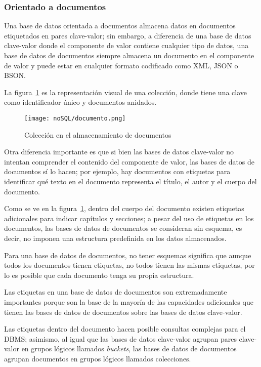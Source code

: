 \subsubsection{Orientado a documentos}
Una base de datos orientada a documentos almacena datos en documentos etiquetados en pares clave-valor; sin embargo, a diferencia de una base de datos clave-valor donde el componente de valor contiene cualquier tipo de datos, una base de datos de documentos siempre almacena un documento en el componente de valor y puede estar en cualquier formato codificado como XML, JSON o BSON.


La figura~\ref{img:documentos-documento} es la representación visual de una colección, donde tiene una clave como identificador único y documentos anidados.

\begin{figure}[H]
    \centering
    \texttt{[image: noSQL/documento.png]}
    \caption{Colección en el almacenamiento de documentos}
    \label{img:documentos-documento}
\end{figure}
Otra diferencia importante es que si bien las bases de datos clave-valor no intentan comprender el contenido del componente de valor, las bases de datos de documentos sí lo hacen; por ejemplo, hay documentos con etiquetas para identificar qué texto en el documento representa el título, el autor y el cuerpo del documento.


Como se ve en la figura~\ref{img:documentos-documento}, dentro del cuerpo del documento existen etiquetas adicionales para indicar capítulos y secciones; a pesar del uso de etiquetas en los documentos, las bases de datos de documentos se consideran sin esquema, es decir, no imponen una estructura predefinida en los datos almacenados.


Para una base de datos de documentos, no tener esquemas significa que aunque todos los documentos tienen etiquetas, no todos tienen las mismas etiquetas, por lo es posible que cada documento tenga su propia estructura.


Las etiquetas en una base de datos de documentos son extremadamente importantes porque son la base de la mayoría de las capacidades adicionales que tienen las bases de datos de documentos sobre las bases de datos clave-valor.


Las etiquetas dentro del documento hacen posible consultas complejas para el DBMS; asimismo, al igual que las bases de datos clave-valor agrupan pares clave-valor en grupos lógicos llamados \textit{buckets}, las bases de datos de documentos agrupan documentos en grupos lógicos llamados colecciones.



